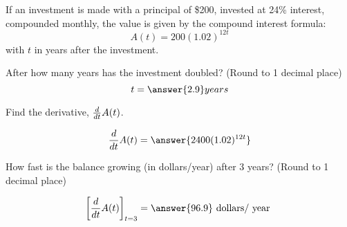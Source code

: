 \documentclass{ximera}
\author{Bobby Ramsey}
\begin{document}
\begin{exercise}

	If an investment is made with a principal of \$200, invested at 24\% interest, compounded monthly, the value is
	given by the compound interest formula:
	\[ A(t) = 200(1.02)^{12 t} \]
	with $t$ in years after the investment.
	
	After how many years has the investment doubled? (Round to 1 decimal place)
	\[ t = \answer{2.9} years \]
	\begin{exercise}
		Find the derivative, $\frac{d}{\mathop{}\!d t}{A(t)}$.
		
		\[ \ddt{A(t)} = \answer{ 2400(1.02)^{12t} } \]
		
		\begin{exercise}
			How fast is the balance growing (in dollars/year) after 3 years? (Round to 1 decimal place)
		
			\[ \eval{\ddt{A(t)}}_{t=3} =  \answer{ 96.9 } \text{ dollars/ year }\]
		\end{exercise}
	\end{exercise}
	
\end{exercise}
\end{document}
